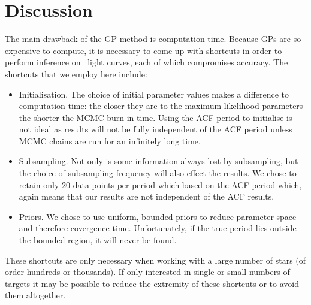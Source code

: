 
\section{Discussion}
\label{sec:discussion}

The main drawback of the GP method is computation time.
Because GPs are so expensive to compute, it is necessary to come up with
shortcuts in order to perform inference on \kepler\ light curves, each of
which compromises accuracy.
The shortcuts that we employ here include:
\begin{itemize}
\item{Initialisation.
The choice of initial parameter values makes a difference to computation time:
the closer they are to the maximum likelihood parameters the shorter the MCMC
burn-in time.
Using the ACF period to initialise is not ideal as results will not be fully
independent of the ACF period unless MCMC chains are run for an infinitely
long time.} \item{Subsampling.
Not only is some information always lost by subsampling, but the choice of
subsampling frequency will also effect the results.
We chose to retain only 20 data points per period which based on the ACF
period which, again means that our results are not independent of the ACF
results.}
\item{Priors.
We chose to use uniform, bounded priors to reduce parameter space and
therefore covergence time.
Unfortunately, if the true period lies outside the bounded region, it will
never be found.}
\end{itemize}

These shortcuts are only necessary when working with a large number of stars
(of order hundreds or thousands).
If only interested in single or small numbers of targets it may be possible to
reduce the extremity of these shortcuts or to avoid them altogether.

